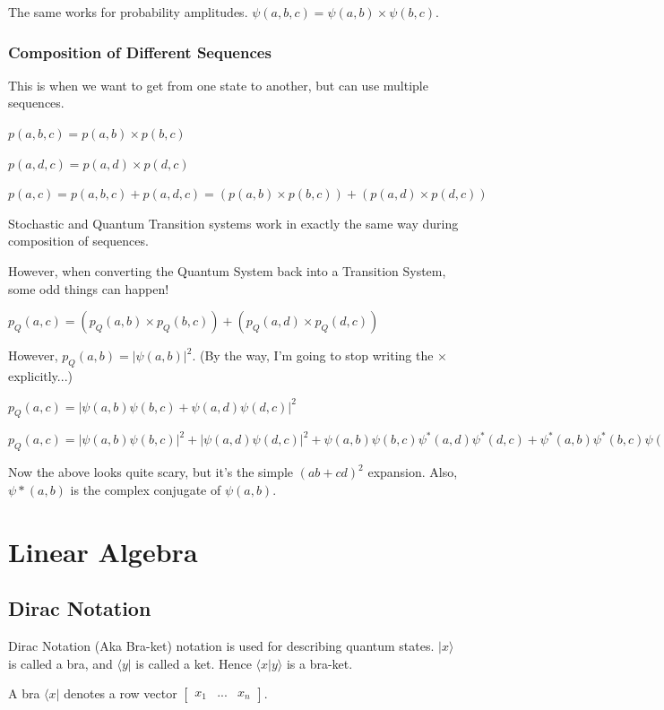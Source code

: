 \documentclass[12pt]{article}
\begin{document}
The same works for probability amplitudes. $\psi(a, b, c) = \psi(a, b) \times \psi(b, c)$.

\subsubsection{Composition of Different Sequences}

This is when we want to get from one state to another, but can use multiple sequences. 

$p(a, b, c) = p(a, b) \times p(b, c)$

$p(a, d, c) = p(a, d) \times p(d, c)$

$p(a, c) = p(a, b, c) + p(a, d, c) = (p(a, b) \times p(b, c)) + (p(a, d) \times p(d, c))$

Stochastic and Quantum Transition systems work in exactly the same way during composition of sequences.

However, when converting the Quantum System back into a Transition System, some odd things can happen!

$p_Q(a, c) = (p_Q(a, b) \times p_Q(b, c)) + (p_Q(a, d) \times p_Q(d, c))$

However, $p_Q(a, b) = |\psi(a, b)|^2$. (By the way, I'm going to stop writing the $\times$ explicitly...)

$p_Q(a,c) = \lvert \psi(a,b)\psi(b,c) + \psi(a,d)\psi(d, c) \rvert^2$

$p_Q(a,c) = \lvert \psi(a,b)\psi(b,c) \rvert^2 + \lvert \psi(a,d)\psi(d,c) \rvert^2 + \psi(a,b)\psi(b,c)\psi^*(a,d)\psi^*(d,c) + \psi^*(a,b)\psi^*(b,c)\psi(a,d)\psi(d,c)$

Now the above looks quite scary, but it's the simple $(ab + cd)^2$ expansion. Also, $\psi*(a,b)$ is the complex conjugate of $\psi(a,b)$.\pagebreak

\section{Linear Algebra}

\subsection{Dirac Notation}

Dirac Notation (Aka Bra-ket) notation is used for describing quantum states. $\lvert x \rangle$ is called a bra, and $\langle y \rvert$ is called a ket. Hence $\langle x \vert y \rangle$ is a bra-ket.

A bra $\langle x \rvert$ denotes a row vector $\begin{bmatrix}x_1 & ... & x_n\end{bmatrix}$.
\end{document}
